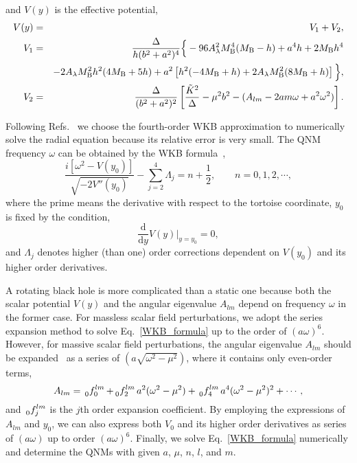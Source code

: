 \documentclass[12pt]{article}
\begin{document}
and $V(y)$ is the effective potential,
\begin{eqnarray}
V(y)&=&V_1+V_2,\nonumber \\
V_1&=&\frac{\Delta }{h(b^2+a^2)^4}\Big\{-96 A_\lambda^2 M_{\rm B}^4(M_{\rm B} - h) + a^4 h + 2 M_{\rm B} h^4 \nonumber \\
& &- 2 A_\lambda M_{\rm B}^2 h^2 (4 M_{\rm B} + 5 h) + 
  a^2 \left[h^2 (-4 M_{\rm B} + h) + 2 A_\lambda M_{\rm B}^2(8 M_{\rm B} + h)\right]\Big\},\nonumber \\
V_2&=&\frac{\Delta }{(b^2+a^2)^2}\left[\frac{\tilde{K}^2}{\Delta}-\mu^2b^2-(A_{lm}-2am\omega+a^2\omega^2)\right]. 
\end{eqnarray}

Following Refs.~\cite{Franzin:2022iai,Konoplya:2019hlu} we choose the fourth-order WKB  approximation to numerically solve the radial equation because its relative error is very small. The QNM frequency $\omega$ can be obtained by the WKB formula~\cite{Iyer:1986nq, Konoplya:2003ii},
    \begin{equation}\label{WKB_formula}
    	\frac{i\left[ \omega^2-V(y_0)\right] }{\sqrt{-2V''(y_0)}}-\sum_{j=2}^{4}\Lambda_j=n+\frac 1 2,\qquad n=0,1,2,\cdots,
    \end{equation}
where the prime means the derivative with respect to the tortoise coordinate, $y_0$ is fixed by the condition, 
\begin{equation}\label{eq:V0}
    \frac{\mathrm d}{\mathrm dy}V(y)\Big|_{y=y_0}=0,
\end{equation}
and $\Lambda_j$ denotes higher (than one) order corrections dependent on $V(y_0)$ and its higher order derivatives.


A rotating black hole is more complicated than a static one because both the scalar potential $V(y)$ and the angular eigenvalue  $A_{lm}$ depend on frequency $\omega$ in the former case. 
For massless scalar field perturbations, we adopt the series expansion method  \cite{Seidel:1989bp} to solve Eq.~\eqref{WKB_formula} up to the order of $(a\omega)^6$. 
However, for massive scalar field perturbations, the angular eigenvalue $A_{lm}$ should be expanded~\cite{seidel1989comment} as a series of $(a\sqrt{\omega^2-\mu^2})$, where it contains only even-order terms,
\begin{equation}
    A_{lm}=\sideset{_{0}}{^{lm}_0}{\mathop f}
    +\sideset{_{0}}{^{lm}_2}{\mathop f}a^2(\omega^2-\mu^2)
    +\sideset{_{0}}{^{lm}_4}{\mathop f}a^4(\omega^2-\mu^2)^2
    +\cdots,
\end{equation}
and $\sideset{_{0}}{^{lm}_j}{\mathop f}$ is the $j$th order expansion coefficient.
By employing the expressions of $A_{lm}$ and $y_0$, we can also express both $V_0$ and its higher order derivatives as series of $(a\omega)$ up to order $(a\omega)^6$. 
Finally, we solve Eq.~\eqref{WKB_formula} numerically and determine the QNMs with given $a$, $\mu$, $n$, $l$, and $m$.    
\end{document}
